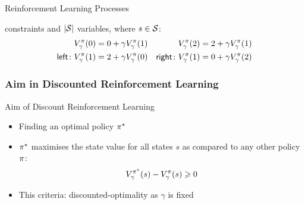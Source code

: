 \documentclass[xcolor=table%
,t]{beamer}
\begin{document}
\begin{frame}[t]
\begin{block}{Reinforcement Learning Processes~\footnotemark}
\begin{itemize}
{        constraints and \(\lvert{\mathcal{S}}\rvert\) variables, where \(s \in \mathcal{S}\):
        \vspace{-5pt}
        \begin{align*}
          V^\pi_{\gamma}(0) & = 0 + \gamma V^\pi_{\gamma}(1) &  V^\pi_{\gamma}(2) & = 2 + \gamma V^\pi_{\gamma}(1) \\ 
          \mathsf{left}\colon V^\pi_{\gamma}(1) & = 2 + \gamma V^\pi_{\gamma}(0) & \mathsf{right}\colon V^\pi_{\gamma}(1) & = 0 + \gamma V^\pi_{\gamma}(2)
        \end{align*}
      }
    \end{itemize}
  \end{block}


\end{frame}


\begin{frame}[t]
  \frametitle{Aim in Discounted Reinforcement Learning}

  \begin{block}{Aim of Discount Reinforcement Learning}
    \begin{itemize}
    \item Finding an optimal policy \(\pi^{\star}\)
    \item \(\pi^{\star}\) maximises the state value for all states \(s\) as compared to any other policy
      \(\pi\):
      \begin{align*}
        V_{\gamma}^{\pi^{\star}}(s) - V_{\gamma}^{\pi}(s) \geqslant 0
      \end{align*}
      \pause{}
    \item This criteria: discounted-optimality %
      as \(\gamma\) is \alert{fixed}
    \end{itemize}

  \end{block}


\end{frame}
\end{document}
